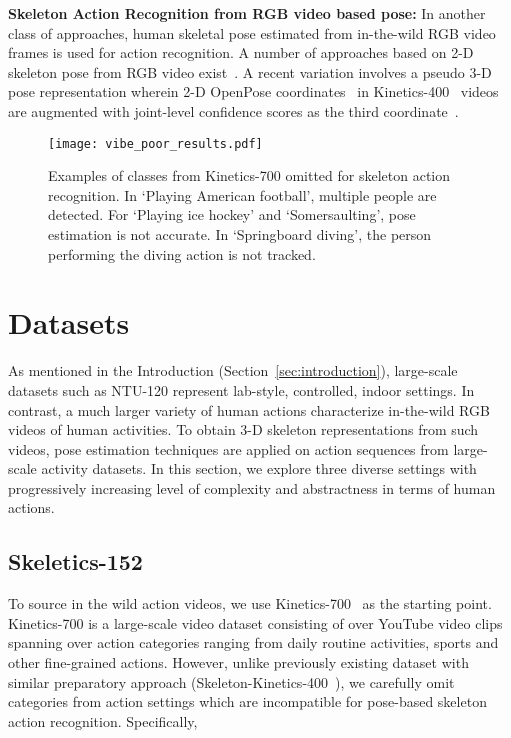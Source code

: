 \documentclass[twocolumn]{svjour3}          \smartqed  \usepackage{graphicx}
\begin{document}
\noindent \textbf{Skeleton Action Recognition from RGB video based pose:} In another class of approaches, human skeletal pose estimated from in-the-wild RGB video frames is used for action recognition. A number of  approaches based on 2-D skeleton pose from RGB video exist~\cite{angelini2018actionxpose,eweiwi2014efficient,ayumi2016pose,cheron2015p,Jhuang_2013_ICCV}. A recent variation involves a pseudo 3-D pose representation wherein 2-D OpenPose coordinates~\cite{cao2018openpose} in Kinetics-400~\cite{Carreira2017QuoVA} videos are augmented with joint-level confidence scores as the third coordinate~\cite{Shi_2019_CVPR,peng2020learning,2sagcn2019cvpr,Li_2019_CVPR,stgcn2018aaai}.
\begin{figure*}[!ht]
\centering
\texttt{[image: vibe\_poor\_results.pdf]}
\caption{Examples of classes from  Kinetics-700 omitted for skeleton action recognition. In `Playing American football', multiple people are detected. For `Playing ice hockey'   and `Somersaulting', pose estimation is not accurate. In `Springboard diving', the person performing the diving action is not tracked.}
\label{fig:vibe_examples}
\end{figure*}

\section{Datasets}
\label{sec:nov_skel_wild}

As mentioned in the Introduction (Section~\ref{sec:introduction}), large-scale datasets such as NTU-120 represent lab-style, controlled, indoor settings. In contrast, a much larger variety of human actions characterize in-the-wild RGB videos of human activities. To obtain 3-D skeleton representations from such videos, pose estimation techniques are applied on action sequences from large-scale activity datasets. In this section, we explore three diverse settings with progressively increasing level of complexity and abstractness in terms of human actions.

\subsection{Skeletics-152}
\label{sec:skeleticsintro}

To source in the wild action videos, we use Kinetics-700~\cite{DBLP:journals/corr/abs-1907-06987} as the starting point. Kinetics-700 is a large-scale video dataset consisting of over  YouTube video clips spanning over  action categories ranging from daily routine activities, sports and other fine-grained actions. However, unlike previously existing dataset with similar preparatory approach (Skeleton-Kinetics-400~\cite{stgcn2018aaai}), we carefully omit categories from action settings which are incompatible for pose-based skeleton action recognition. Specifically,
 
\end{document}
